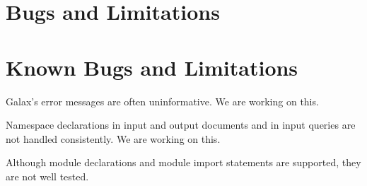 \section{Bugs and Limitations}
\label{sec:bugs}
\section{Known Bugs and Limitations}

Galax's error messages are often uninformative.  We are working on
this.

Namespace declarations in input and output documents and in input
queries are not handled consistently.  We are working on this.

Although module declarations and module import statements are
supported, they are not well tested. 

\begin{alltt}

\end{alltt}

